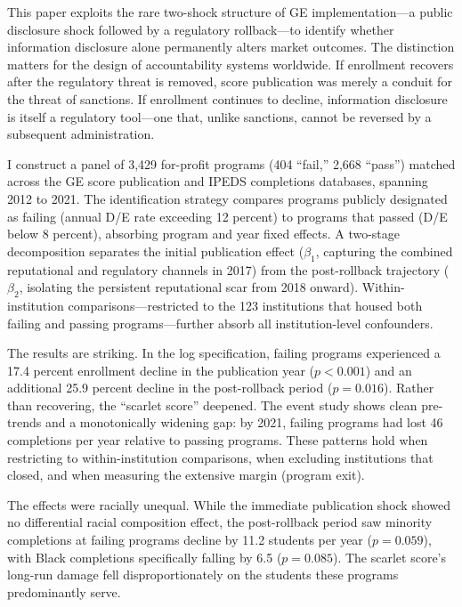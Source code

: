 \documentclass[12pt]{article}
\begin{document}
This paper exploits the rare two-shock structure of GE implementation---a public disclosure shock followed by a regulatory rollback---to identify whether information disclosure alone permanently alters market outcomes. The distinction matters for the design of accountability systems worldwide. If enrollment recovers after the regulatory threat is removed, score publication was merely a conduit for the threat of sanctions. If enrollment continues to decline, information disclosure is itself a regulatory tool---one that, unlike sanctions, cannot be reversed by a subsequent administration.

I construct a panel of 3,429 for-profit programs (404 ``fail,'' 2,668 ``pass'') matched across the GE score publication and IPEDS completions databases, spanning 2012 to 2021. The identification strategy compares programs publicly designated as failing (annual D/E rate exceeding 12 percent) to programs that passed (D/E below 8 percent), absorbing program and year fixed effects. A two-stage decomposition separates the initial publication effect ($\beta_1$, capturing the combined reputational and regulatory channels in 2017) from the post-rollback trajectory ($\beta_2$, isolating the persistent reputational scar from 2018 onward). Within-institution comparisons---restricted to the 123 institutions that housed both failing and passing programs---further absorb all institution-level confounders.

The results are striking. In the log specification, failing programs experienced a 17.4 percent enrollment decline in the publication year ($p < 0.001$) and an additional 25.9 percent decline in the post-rollback period ($p = 0.016$). Rather than recovering, the ``scarlet score'' deepened. The event study shows clean pre-trends and a monotonically widening gap: by 2021, failing programs had lost 46 completions per year relative to passing programs. These patterns hold when restricting to within-institution comparisons, when excluding institutions that closed, and when measuring the extensive margin (program exit).

The effects were racially unequal. While the immediate publication shock showed no differential racial composition effect, the post-rollback period saw minority completions at failing programs decline by 11.2 students per year ($p = 0.059$), with Black completions specifically falling by 6.5 ($p = 0.085$). The scarlet score's long-run damage fell disproportionately on the students these programs predominantly serve.
\end{document}
